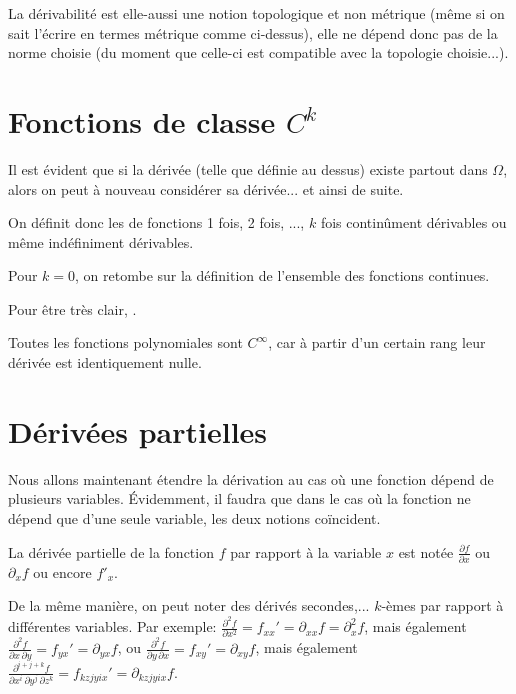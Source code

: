 \medskip
La dérivabilité est elle-aussi une notion topologique et non métrique (même si on sait
l'écrire en termes métrique comme ci-dessus), elle ne dépend donc pas
de la norme choisie (du moment que celle-ci est compatible avec la topologie choisie...).

\medskip
\section{Fonctions de classe $C^k$}

\medskip
Il est évident que si la dérivée (telle que définie au dessus) existe partout dans
$\Omega$, alors on peut à nouveau considérer sa dérivée... et ainsi de suite.

On définit donc les 
de fonctions 1 fois, 2 fois, ..., $k$ fois continûment dérivables ou même indéfiniment
dérivables.

\medskip
Pour $k=0$, on retombe sur la définition de l'ensemble des fonctions
continues.

Pour être très clair, .

Toutes les fonctions polynomiales sont $C^\infty$, car à partir d'un certain rang
leur dérivée est identiquement nulle.

\medskip
\section{Dérivées partielles}
Nous allons maintenant étendre la dérivation au cas où une fonction dépend
de plusieurs variables.
Évidemment, il faudra que dans le cas où la fonction ne dépend que d'une seule
variable, les deux notions coïncident.

\medskip
{}

\medskip
La dérivée partielle de la fonction $f$ par rapport à la variable $x$ est notée
$\frac{ \partial f }{ \partial x }$ ou $\partial_x f$ ou encore $f'_x$.

\medskip
De la même manière, on peut noter des dérivés secondes,... $k$-èmes par
rapport à différentes variables.
Par exemple: $\frac{ \partial^2 f}{ \partial x^2} = f_{xx}' = \partial_{xx} f = \partial^2_x f$,
mais également $\frac{ \partial^2 f}{\partial x\,\partial y} = f_{yx}' = \partial_{yx} f$, ou
$\frac{ \partial^2 f}{\partial y\,\partial x} = f_{xy}' = \partial_{xy} f $, mais également
$\frac{ \partial^{i+j+k} f}{ \partial x^i\, \partial y^j\, \partial z^k } = f_{kz jy ix}' = \partial_{kz jy ix} f $.

